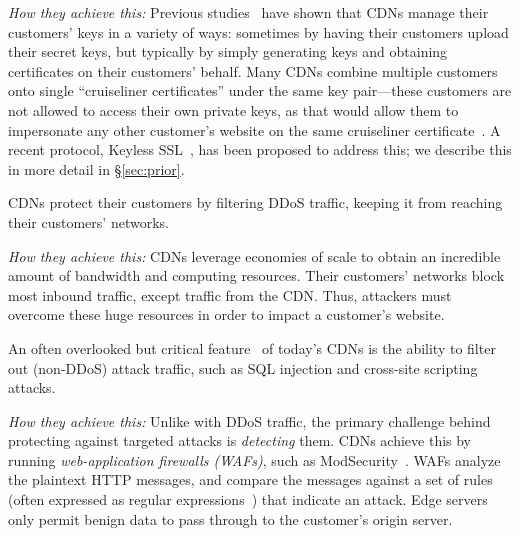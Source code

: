 \medskip\noindent
%
\emph{How they achieve this:}
%
Previous studies~\cite{key-sharing,when-https-meets-cdn} have shown
that CDNs manage their customers' keys in a variety of ways: sometimes
by having their customers upload their secret keys, but typically by
simply generating keys and obtaining certificates on their customers'
behalf.
%
Many CDNs combine multiple customers onto single ``cruiseliner
certificates'' under the same key pair---these customers are not allowed
to access their own private keys, as that would allow them to
impersonate any other customer's website on the same cruiseliner
certificate~\cite{key-sharing}.
%
A recent protocol, Keyless SSL~\cite{keyless-ssl}, has been proposed
to address this; we describe this in more detail in \S\ref{sec:prior}.


%
CDNs protect their customers by filtering DDoS traffic, keeping it from
reaching their customers' networks.

\medskip\noindent
%
\emph{How they achieve this:}
%
CDNs leverage economies of scale to obtain an incredible amount of
bandwidth and computing resources.  Their customers' networks block
most inbound traffic, except traffic from the CDN.
%
Thus, attackers must overcome these huge resources in order to impact a
customer's website.


%
An often overlooked but critical feature~\cite{securing-cdns} of
today's CDNs is the ability to filter out (non-DDoS) attack traffic,
such as SQL injection and cross-site scripting attacks.


\medskip\noindent
%
\emph{How they achieve this:}
%
Unlike with DDoS traffic, the primary challenge behind protecting
against targeted attacks is \emph{detecting} them.
%
CDNs achieve this by running \emph{web-application firewalls (WAFs)},
such as ModSecurity~\cite{modsecurity}.
%
WAFs analyze the plaintext HTTP messages, and compare the messages against
a set of rules (often expressed as regular expressions~\cite{owasp})
that indicate an attack.
%
Edge servers only permit benign data to pass through to the customer's
origin server.




